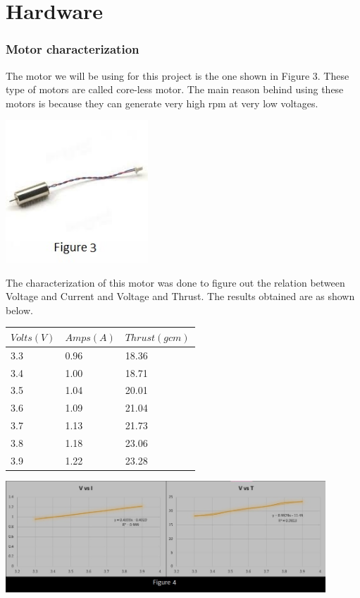 \documentclass[9pt]{article}
\begin{document}
\part{Hardware}

\section{Motor characterization}

\noindent The motor we will be using for this project is the one shown in Figure $3$. These type of motors are called core-less motor. The main reason behind using these motors is because they can generate very high rpm at very low voltages.

\begin{center}
\includegraphics[width=0.4\textwidth]{3.jpg}
\end{center}

\noindent The characterization of this motor was done to figure out the relation between Voltage and Current and Voltage and Thrust. The results obtained are as shown below.

\begin{center}
\begin{tabular}{ |p{1.3cm}|p{1.3cm}|p{1.9cm}|}
\hline
$Volts (V)$ & $Amps (A)$ & $Thrust (g cm)$\\
\hline
3.3 & 0.96 & 18.36 \\
3.4 & 1.00 & 18.71 \\
3.5 & 1.04 & 20.01 \\
3.6 & 1.09 & 21.04 \\
3.7 & 1.13 & 21.73 \\
3.8 & 1.18 & 23.06 \\
3.9 & 1.22 & 23.28 \\     
\hline
\end{tabular}
\end{center}

\begin{center}
\includegraphics[width=0.9\textwidth]{4.jpg}
\end{center}
\end{document}
